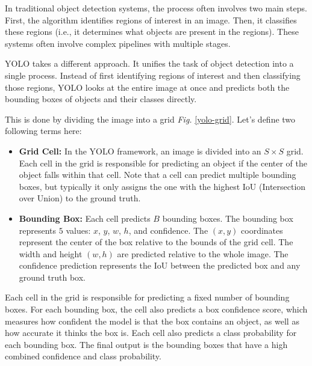 \documentclass[14pt,a4paper]{extarticle}
\newcounter{e}
\newcounter{pic}
\numberwithin{equation}{section}
\numberwithin{figure}{section}
\begin{document}
In traditional object detection systems, the process often involves two main steps. First, the algorithm identifies regions of interest in an image. Then, it classifies these regions (i.e., it determines what objects are present in the regions). These systems often involve complex pipelines with multiple stages.

YOLO takes a different approach. It unifies the task of object detection into a single process. Instead of first identifying regions of interest and then classifying those regions, YOLO looks at the entire image at once and predicts both the bounding boxes of objects and their classes directly.

This is done by dividing the image into a grid \textit{Fig.} \ref{yolo-grid}. Let's define two following terms here:
\begin{itemize}
    \item \textbf{Grid Cell:} In the YOLO framework, an image is divided into an $S \times S$ grid. Each cell in the grid is responsible for predicting an object if the center of the object falls within that cell. Note that a cell can predict multiple bounding boxes, but typically it only assigns the one with the highest IoU (Intersection over Union) to the ground truth.
    \item \textbf{Bounding Box:} Each cell predicts $B$ bounding boxes. The bounding box represents $5$ values: $x$, $y$, $w$, $h$, and confidence. The $(x, y)$ coordinates represent the center of the box relative to the bounds of the grid cell. The width and height $(w, h)$ are predicted relative to the whole image. The confidence prediction represents the IoU between the predicted box and any ground truth box.
\end{itemize}

Each cell in the grid is responsible for predicting a fixed number of bounding boxes. For each bounding box, the cell also predicts a box confidence score, which measures how confident the model is that the box contains an object, as well as how accurate it thinks the box is. Each cell also predicts a class probability for each bounding box. The final output is the bounding boxes that have a high combined confidence and class probability.
\end{document}

